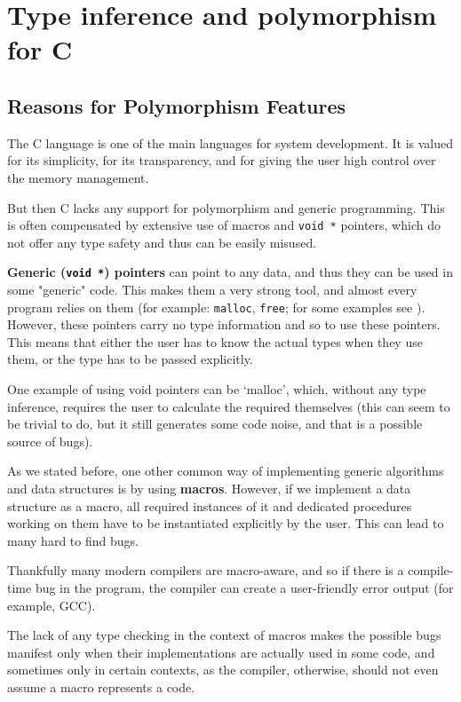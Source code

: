 \chapter{Type inference and polymorphism for C}
\label{chap:infPolyC}
\newcommand{\lambdac}[1]{\ensuremath{{[[ #1 ]]}_{\lambda_C}}}

\section{Reasons for Polymorphism Features}

The C language is one of the main languages for system development. It is valued for its simplicity, for its transparency, and for giving the user high control over the memory management.

But then C lacks any support for polymorphism and generic programming. This is often compensated by extensive use of macros and \lstinline{void *} pointers, which do not offer any type safety and thus can be easily misused.

\textbf{Generic (\lstinline{void *}) pointers} can point to any data, and thus they can be used in some "generic" code. This makes them a very strong tool, and almost every program relies on them (for example: \lstinline{malloc}, \lstinline{free}; for some examples see \cite{organisation1999iso}). However, these pointers carry no type information and so to use these pointers. This means that either the user has to know the actual types when they use them, or the type has to be passed explicitly.

One example of using void pointers can be `malloc', which, without any type inference, requires the user to calculate the required themselves (this can seem to be trivial to do, but it still generates some code noise, and that is a possible source of bugs).

As we stated before, one other common way of implementing generic algorithms and data structures is by using \textbf{macros}. However, if we implement a data structure as a macro, all required instances of it and dedicated procedures working on them have to be instantiated explicitly by the user. This can lead to many hard to find bugs.

Thankfully many modern compilers are macro-aware, and so if there is a compile-time bug in the program, the compiler can create a user-friendly error output (for example, GCC). %

The lack of any type checking in the context of macros makes the possible bugs manifest only when their implementations are actually used in some code, and sometimes only in certain contexts, as the compiler, otherwise, should not even assume a macro represents a code.

